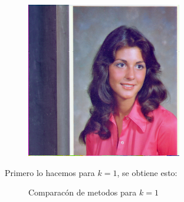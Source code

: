 \begin{figure}[H]
\centering
\includegraphics[scale=0.50]{fotos/rostro/orig.png}
\end{figure}

Primero lo hacemos para $k=1$, se obtiene esto:

\begin{figure}[H]
    \centering
    \qquad
    \qquad
    \caption{Comparacón de metodos para $k = 1$}%
    \label{fig:example}%
\end{figure}


